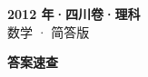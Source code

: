 \documentclass[zihao=-4, a4paper]{ctexart}
\begin{document}
\begin{center}
  {\Large\bfseries 2012 年·四川卷·理科}\\[4pt]
  {\large 数学 · 简答版}
\end{center}
\medskip
{}

\clearpage
{}
\begin{center}{\Large\bfseries 答案速查}\end{center}
\medskip

\end{document}
